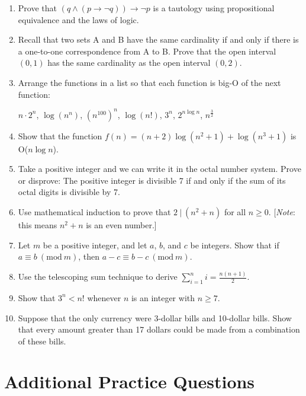 \documentclass[letterpaper, 12pt]{article}
\newcommand{\PMod}[1]{\ (\mathrm{mod}\ #1)}
\begin{document}
\begin{enumerate}
    \item Prove that $(q \land (p \to \neg q)) \to \neg p$ is a tautology using propositional equivalence and the laws of logic.
    \item Recall that two sets A and B have the same cardinality if and only if there is a one-to-one correspondence from A to B. Prove that the open interval $(0, 1)$ has the same cardinality as the open interval $(0, 2)$.
    \item Arrange the functions in a list so that each function is big-O of the next function:
    
    $n \cdot 2^n$, $\log(n^n)$, $(n^{100})^n$, $\log(n!)$, $3^n$, $2^{n \log n}$, $n^{\frac{3}{2}}$
    
    \item Show that the function $f(n) = (n + 2)\log(n^2 + 1) + \log(n^3 + 1)$ is O($n \log n$).
    \item Take a positive integer and we can write it in the octal number system. Prove or disprove: The positive integer is divisible 7 if and only if the sum of its octal digits is divisible by 7.
    \item Use mathematical induction to prove that $2\ |\ (n^2 + n)$ for all $n \geq 0$. [\textit{Note}: this means $n^2 + n$ is an even number.]
    \item Let $m$ be a positive integer, and let $a$, $b$, and $c$ be integers. Show that if $a \equiv b \PMod{m}$, then $a - c \equiv b - c \PMod{m}$.
    \item Use the telescoping sum technique to derive $\sum_{i=1}^{n} i = \frac{n(n + 1)}{2}$.
    \item Show that $3^n < n!$ whenever $n$ is an integer with $n \geq 7$.
    \item Suppose that the only currency were 3-dollar bills and 10-dollar bills. Show that every amount greater than 17 dollars could be made from a combination of these bills.
\end{enumerate}

\section{Additional Practice Questions}
\end{document}
